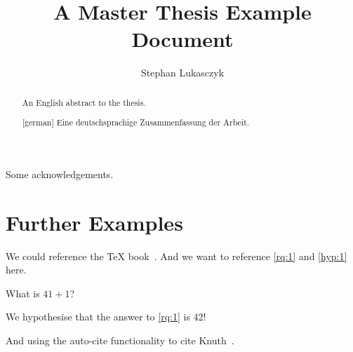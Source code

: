 \documentclass[%
  chapterprefix=false,%
  open=right,%
  twoside=true,%
  paper=a4,%
  logofile={logo.pdf},%
  logoalignment=right,%
  thesistype=master,%
  UKenglish,%
]{se2thesis}
\author{Stephan Lukasczyk}
\title{A Master Thesis Example Document}
\institute{Chair of Example}
\begin{document}
\frontmatter

\maketitle

\authorshipDeclaration

\begin{abstract}
  An English abstract to the thesis.
\end{abstract}

\begin{abstract}[german]
  Eine deutschsprachige Zusammenfassung der Arbeit.
\end{abstract}

\begin{acknowledgements}
  Some acknowledgements.
\end{acknowledgements}

\tableofcontents

\mainmatter

\blinddocument

\section{Further Examples}

We could reference the \TeX{} book~\autocite{Knu86}.  And we want to reference
\cref{rq:1} and \cref{hyp:1} here.

\begin{resq}\label{rq:1}
    What is \(41 + 1\)?
\end{resq}

\begin{hyp}\label{hyp:1}
  We hypothesise that the answer to \cref{rq:1} is 42!
\end{hyp}

And using the auto-cite functionality to cite Knuth~\autocite{Knu86}.

\backmatter

\printbibliography
\end{document}
